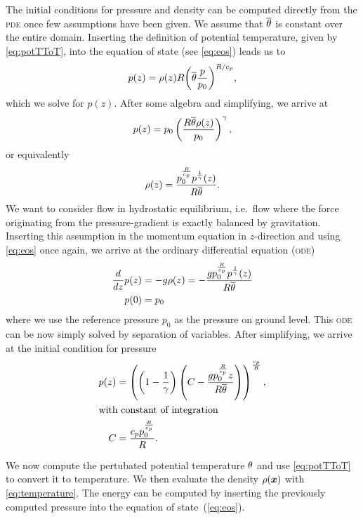 The initial conditions for pressure and density can be computed directly from the \textsc{pde} once few assumptions have been given.
We assume that $\overline{\theta}$ is constant over the entire domain.
Inserting the definition of potential temperature, given by \cref{eq:potTToT}, into the equation of state (see \cref{eq:eos}) leads us to
\begin{equation}
  p(z) = \rho(z) R {\left( \overline{\theta} \frac{p}{p_0}\right)}^{R/c_p},
\end{equation}
which we solve for $p(z)$.
After some algebra and simplifying, we arrive at
\begin{equation}
 p(z) = p_0 \left( \frac{R \overline{\theta} \rho(z)}{p_0} \right)^{\gamma},
\end{equation}
or equivalently
\begin{equation}
  \label{eq:eos-potT}
\rho(z) = \frac{p_{0}^{\frac{R}{c_{p}}} p^{\frac{1}{\gamma}}{\left (z \right )}}{R \overline{\theta}}.
\end{equation}
We want to consider flow in hydrostatic equilibrium, i.e.\ flow where the force originating from the pressure-gradient is exactly balanced by gravitation.
Inserting this assumption in the momentum equation in $z$-direction and using \cref{eq:eos} once again, we arrive at the ordinary differential equation (\textsc{ode})
\begin{align}
  \label{eq:hydrostatic-balance-potT}
  \begin{split}
  \frac{d}{d z} p{\left (z \right )} &= -g \rho(z)
                                     = 
        - \frac{g p_{0}^{\frac{R}{c_{p}}} p^{\frac{1}{\gamma}}{\left (z \right )}}{R \overline{\theta}}\\
  p{\left (0 \right )} &= p_0
  \end{split}
\end{align}
where we use the reference pressure $p_0$ as the pressure on ground level.
This \textsc{ode} can be now simply solved by separation of variables.
After simplifying, we arrive at the initial condition for pressure
\begin{align}
  \label{eq:hydrostatic-background-pressure}
p(z) &= \left(\left(1 - \frac{1}{\gamma}\right) \left(C - \frac{g p_{0}^{\frac{R}{c_{p}}} z}{R \overline{\theta}}\right)\right)^{\frac{c_{p}}{R}},\\
\shortintertext{with constant of integration}
 C &= \frac{c_{p} p_{0}^{\frac{R}{c_{p}}}}{R}.
\end{align}

We now compute the pertubated potential temperature $\theta$ and use \cref{eq:potTToT} to convert it to temperature.
We then evaluate the density $\rho(\bm{x})$ with \cref{eq:temperature}.
The energy can be computed by inserting the previously computed pressure into the equation of state~(\ref{eq:eos}).

